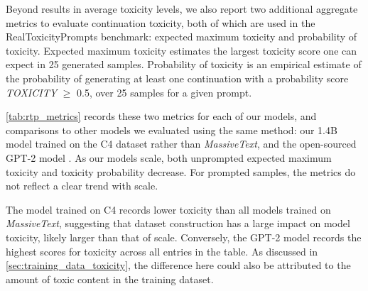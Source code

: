 \documentclass[11pt, a4paper, logo, internal, copyright, nonumbering]{deepmind}
\newcommand{\massivetext}{\textit{MassiveText}\xspace}
\begin{document}
Beyond results in average toxicity levels, we also report two additional aggregate metrics to evaluate continuation toxicity, both of which are used in the RealToxicityPrompts benchmark: expected maximum toxicity and probability of toxicity. Expected maximum toxicity estimates the largest toxicity score one can expect in 25 generated samples. Probability of toxicity is an empirical estimate of the probability of generating at least one continuation with a probability score \textit{TOXICITY} $\geq$ 0.5, over 25 samples for a given prompt.

\autoref{tab:rtp_metrics} records these two metrics for each of our models, and comparisons to other models we evaluated using the same method: our 1.4B model trained on the C4 dataset \citep{raffel2020exploring} rather than \massivetext, and the open-sourced GPT-2 model \citep{radford2019language}.
As our models scale, both unprompted expected maximum toxicity and toxicity probability decrease. For prompted samples, the metrics do not reflect a clear trend with scale.

The model trained on C4 records lower toxicity than all models trained on \massivetext, suggesting that dataset construction has a large impact on model toxicity, likely larger than that of scale. Conversely, the GPT-2 model records the highest scores for toxicity across all entries in the table. As discussed in \autoref{sec:training_data_toxicity}, the difference here could also be attributed to the amount of toxic content in the training dataset.
\end{document}
